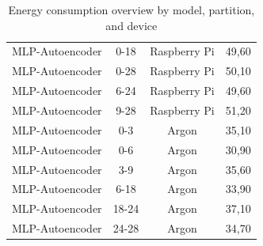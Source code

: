 \begin{table}[H]
\begin{tabular}{|c|c|c|c|}
        MLP-Autoencoder & 0-18 & Raspberry Pi & 49,60 \\
        MLP-Autoencoder & 0-28 & Raspberry Pi & 50,10 \\
        MLP-Autoencoder & 6-24 & Raspberry Pi & 49,60 \\
        MLP-Autoencoder & 9-28 & Raspberry Pi & 51,20 \\
        MLP-Autoencoder & 0-3 & Argon & 35,10 \\
        MLP-Autoencoder & 0-6 & Argon & 30,90 \\
        MLP-Autoencoder & 3-9 & Argon & 35,60 \\
        MLP-Autoencoder & 6-18 & Argon & 33,90 \\
        MLP-Autoencoder & 18-24 & Argon & 37,10 \\
        MLP-Autoencoder & 24-28 & Argon & 34,70 \\
        \hline
    \end{tabular}
    \caption{Energy consumption overview by model, partition, and device}
    \label{tab:submodelEnergy}
\end{table}
